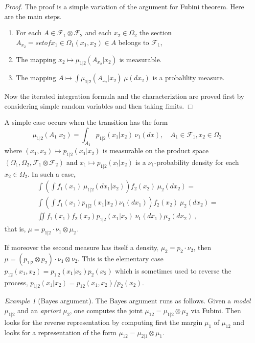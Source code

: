 \documentclass[12pt,a4paper]{amsart}
\theoremstyle{plain}%
\theoremstyle{definition}
\theoremstyle{remark}
\newtheorem{example}{Example}
\begin{document}
\begin{proof}
The proof is a simple variation of the argument for Fubini
theorem. Here are the main steps.
\begin{enumerate}
\item For each $A \in \mathcal F_1 \otimes \mathcal F_2$ and each $x_2
  \in \Omega_2$ the section $A_{x_2} = setof{x_1 \in
    \Omega_1}{(x_1,x_2) \in A}$ belongs to $\mathcal F_1$,
  \item The mapping $x_2 \mapsto \mu_{1|2}(A_{x_2}|x_2)$ is
    measurable.
  \item The mapping $A \mapsto \int \mu_{1|2}(A_{x_2}|x_2) \
    \mu(dx_2)$ is a probalility measure.
\end{enumerate}
Now the iterated integration formula and the characteriztion are
proved first by considering simple random variables and then taking limits.
\end{proof}

A simple case occurs when the transition has the form
\begin{equation*}
  \mu_{1|2}(A_1|x_2) = \int_{A_1} p_{1|2}(x_1|x_2) \ \nu_1(dx), \quad A_1 \in \mathcal F_1, x_2 \in \Omega_2 \,
\end{equation*}
where $(x_1,x_2) \mapsto p_{1|2}(x_1|x_2)$ is measurable on the product space $(\Omega_1,\Omega_2, \mathcal F_1 \otimes \mathcal F_2)$ and $x_1 \mapsto p_{1|2}(x_!|x_2)$ is a $\nu_1$-probability density for each $x_2 \in \Omega_2$. In such a case,  
\begin{multline*}
\int \left(\int f_1(x_1) \ \mu_{1|2}(dx_1|x_2)\right)f_2(x_2) \ \mu_2(dx_2) = \\ \int \left(\int f_1(x_1) p_{1|2}(x_1|x_2) \nu_1(dx_1)\right)f_2(x_2) \ \mu_2(dx_2) = \\ \iint f_1(x_1)f_2(x_2) p_{1|2}(x_1|x_2) \ \nu_1(dx_1) \mu_2(dx_2) \ ,
\end{multline*}
that is, $\mu = p_{1|2} \cdot \nu_1 \otimes \mu_2$.

If moreover the second measure has itself a density,
$\mu_2 = p_2 \cdot \nu_2$, then
$\mu = (p_{1|2} \otimes p_2) \cdot \nu_1 \otimes \nu_2$. This is the
elementary case $p_{12}(x_1,x_2) = p_{1|2}(x_1|x_2)p_2(x_2)$ which is
sometimes used to reverse the process,
$p_{1|2}(x_1|x_2) = p_{12}(x_1,x_2)/p_2(x_2)$.

\begin{example}[Bayes argument] The Bayes argument runs as
  follows. Given a \emph{model} $\mu_{1|2}$ and an \emph{apriori}
  $\mu_2$, one computes the joint $\mu_{12} = \mu_{1|2} \otimes \mu_2$ via Fubini. Then looks
  for the reverse representation by computing first the margin $\mu_1$
  of $\mu_{12}$ and looks for a representation of the form $\mu_{12} =
  \mu_{2|1} \otimes \mu_1$.  
 \end{example}
\end{document}

